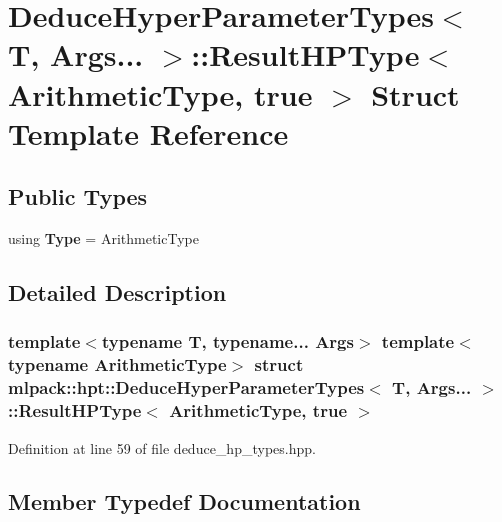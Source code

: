 \section{Deduce\+Hyper\+Parameter\+Types$<$ T, Args... $>$\+:\+:Result\+H\+P\+Type$<$ Arithmetic\+Type, true $>$ Struct Template Reference}
\label{structmlpack_1_1hpt_1_1DeduceHyperParameterTypes_3_01T_00_01Args_8_8_8_01_4_1_1ResultHPType_3_01ArithmeticType_00_01true_01_4}
\subsection*{Public Types}
\begin{DoxyCompactItemize}
\item 
using \textbf{ Type} = Arithmetic\+Type
\end{DoxyCompactItemize}


\subsection{Detailed Description}
\subsubsection*{template$<$typename T, typename... Args$>$\newline
template$<$typename Arithmetic\+Type$>$\newline
struct mlpack\+::hpt\+::\+Deduce\+Hyper\+Parameter\+Types$<$ T, Args... $>$\+::\+Result\+H\+P\+Type$<$ Arithmetic\+Type, true $>$}



Definition at line 59 of file deduce\+\_\+hp\+\_\+types.\+hpp.



\subsection{Member Typedef Documentation}
\mbox{\label{structmlpack_1_1hpt_1_1DeduceHyperParameterTypes_3_01T_00_01Args_8_8_8_01_4_1_1ResultHPType_3_01ArithmeticType_00_01true_01_4_a73709384a51a57b7531673c1989560a7}} 
